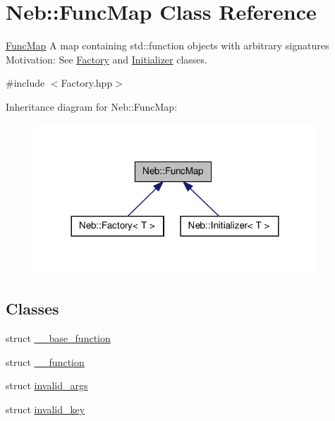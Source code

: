 \hypertarget{classNeb_1_1FuncMap}{\section{\-Neb\-:\-:\-Func\-Map \-Class \-Reference}
\label{classNeb_1_1FuncMap}
}


\hyperlink{classNeb_1_1FuncMap}{\-Func\-Map} \-A map containing {\ttfamily std\-::function} objects with arbitrary signatures \-Motivation\-: \-See \hyperlink{classNeb_1_1Factory}{\-Factory} and \hyperlink{classNeb_1_1Initializer}{\-Initializer} classes.  




{\ttfamily \#include $<$\-Factory.\-hpp$>$}



\-Inheritance diagram for \-Neb\-:\-:\-Func\-Map\-:\nopagebreak
\begin{figure}[H]
\begin{center}
\leavevmode
\includegraphics[width=300pt]{classNeb_1_1FuncMap__inherit__graph}
\end{center}
\end{figure}
\subsection*{\-Classes}
\begin{DoxyCompactItemize}
\item 
struct \hyperlink{structNeb_1_1FuncMap_1_1____base__function}{\-\_\-\-\_\-base\-\_\-function}
\item 
struct \hyperlink{structNeb_1_1FuncMap_1_1____function}{\-\_\-\-\_\-function}
\item 
struct \hyperlink{structNeb_1_1FuncMap_1_1invalid__args}{invalid\-\_\-args}
\item 
struct \hyperlink{structNeb_1_1FuncMap_1_1invalid__key}{invalid\-\_\-key}
\end{DoxyCompactItemize}
